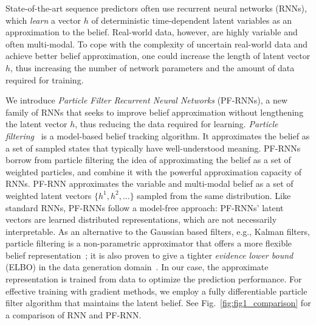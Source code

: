 \documentclass[letterpaper]{article} %
\begin{document}
State-of-the-art sequence predictors often use recurrent neural networks (RNNs), which \textit{learn} a vector $h$ of deterministic time-dependent latent variables as an approximation to the belief. Real-world data, however, are highly variable and often multi-modal. To cope with the complexity of uncertain real-world data and achieve better belief approximation, one could increase the length of latent vector $h$, thus increasing the number of network parameters and the amount of data required for training.

We introduce  \textit{Particle Filter Recurrent Neural Networks} (PF-RNNs), a new family of RNNs that seeks to improve belief approximation without lengthening the latent vector $h$,  thus reducing the data required for learning.
\textit{Particle filtering}~\cite{del1996non} is a model-based belief tracking algorithm. It approximates the belief as a set of sampled states that typically have well-understood meaning. PF-RNNs borrow from particle filtering the idea of approximating the belief as a set of weighted particles, and combine it with the powerful approximation capacity of RNNs.
PF-RNN approximates the variable and multi-modal belief as a set of weighted latent vectors $\{h^1, h^2, \ldots\}$ sampled from the same distribution. 
Like standard RNNs, PF-RNNs follow a model-free approach: PF-RNNs' latent vectors are learned distributed representations, which are not necessarily interpretable.   
As an alternative to the Gaussian based filters, e.g., Kalman filters, particle filtering is a non-parametric approximator that offers a more flexible belief representation~\cite{del1996non}; it is also proven to give a tighter \textit{evidence lower bound} (ELBO) in the data generation domain~\cite{burda2015importance}.
In our case, the approximate representation is trained from data to optimize the prediction performance. For effective training with gradient methods, we employ a fully differentiable particle filter algorithm that maintains the latent belief. 
See Fig.~\ref{fig:fig1_comparison} for a  comparison
of RNN and PF-RNN.
\end{document}
